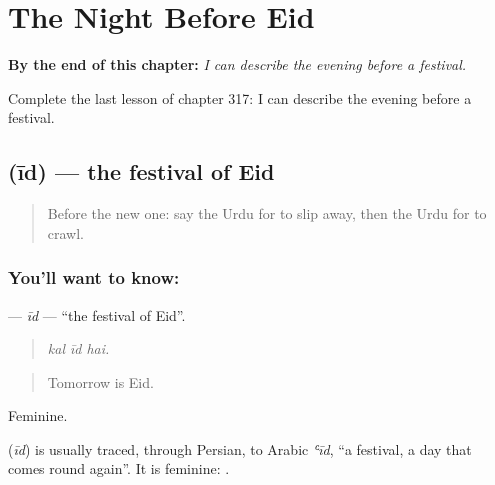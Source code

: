 
\chapter{The Night Before Eid}
\label{ch:ur-the-night-before-eid}

\begin{chapteropening}
\textbf{By the end of this chapter:} \emph{I can describe the evening before a festival.}

Complete the last lesson of chapter 317: I can describe the evening before a festival.
\end{chapteropening}

\section[\texorpdfstring{\ur{عید} (īd)}{عید (īd)}]{ (īd) — the festival of Eid}

\label{lesson:UR-C317-id}



\begin{quote}
Before the new one: say the Urdu for to slip away, then the Urdu for to crawl.
\end{quote}

\subsection*{You'll want to know: }
\textbf{} — \emph{īd} — \textquotedblleft{}the festival of Eid\textquotedblright{}.

\begin{quote}
  
\end{quote}

\begin{quote}
\emph{kal īd hai.}
\end{quote}

\begin{quote}
Tomorrow is Eid.
\end{quote}

Feminine.

\begin{cousinweb}
\textbf{} (\emph{īd}) is usually traced, through Persian, to Arabic \emph{ʿīd}, \textquotedblleft{}a festival, a day that comes round again\textquotedblright{}. It is feminine: \textbf{ }.
\end{cousinweb}

